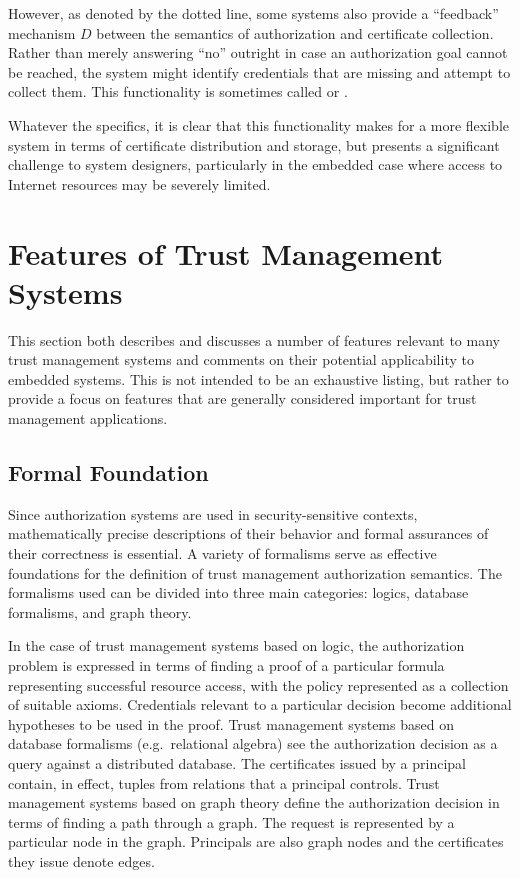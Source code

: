 However, as denoted by the dotted line, some systems also provide a ``feedback'' mechanism $D$
between the semantics of authorization and certificate collection. Rather than merely answering
``no'' outright in case an authorization goal cannot be reached, the system might identify
credentials that are missing and attempt to collect them. This functionality is sometimes called
 \cite{Li:DCDTM} or  \cite{Gunter:PDCR}.

Whatever the specifics, it is clear that this functionality makes for a more flexible system in
terms of certificate distribution and storage, but presents a significant challenge to system
designers, particularly in the embedded case where access to Internet resources may be severely
limited.

\section{Features of Trust Management Systems}
\label{section-features}

This section both describes and discusses a number of features relevant to many trust management
systems and comments on their potential applicability to embedded systems. This is not intended
to be an exhaustive listing, but rather to provide a focus on features that are generally considered
important for trust management applications.

\subsection{Formal Foundation}

Since authorization systems are used in security-sensitive contexts, mathematically precise
descriptions of their behavior and formal assurances of their correctness is essential. A
variety of formalisms serve as effective foundations for the definition of trust management
authorization semantics. The formalisms used can be divided into three main categories: logics,
database formalisms, and graph theory.

In the case of trust management systems based on logic, the authorization problem is expressed
in terms of finding a proof of a particular formula representing successful resource access,
with the policy represented as a collection of suitable axioms. Credentials relevant to a
particular decision become additional hypotheses to be used in the proof. Trust management
systems based on database formalisms (e.g.~relational algebra) see the authorization decision as
a query against a distributed database. The certificates issued by a principal contain, in
effect, tuples from relations that a principal controls. Trust management systems based on graph
theory define the authorization decision in terms of finding a path through a graph. The request
is represented by a particular node in the graph. Principals are also graph nodes and the
certificates they issue denote edges.

